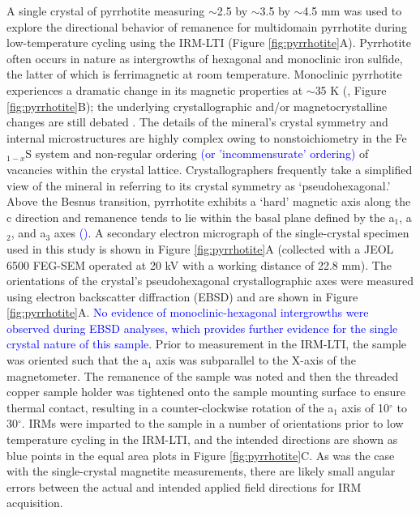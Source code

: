 \documentclass[draft,gc]{AGUTeX}
\begin{document}
\begin{article}
A single crystal of pyrrhotite measuring $\sim$2.5 by $\sim$3.5 by $\sim$4.5 mm was used to explore the directional behavior of remanence for multidomain pyrrhotite during low-temperature cycling using the IRM-LTI (Figure \ref{fig:pyrrhotite}A). Pyrrhotite often occurs in nature as intergrowths of hexagonal and monoclinic iron sulfide, the latter of which is ferrimagnetic at room temperature. Monoclinic pyrrhotite experiences a dramatic change in its magnetic properties at $\sim$35 K (\cite{Besnus1964a}, Figure \ref{fig:pyrrhotite}B); the underlying crystallographic and/or magnetocrystalline changes are still debated \citep{Wolfers2011a, Kind2013a}. The details of the mineral's crystal symmetry and internal microstructures are highly complex owing to nonstoichiometry in the Fe$_{1-x}$S system and non-regular ordering \textcolor{blue}{(or 'incommensurate' ordering)} of vacancies within the crystal lattice.  Crystallographers frequently take a simplified view of the mineral in referring to its crystal symmetry as `pseudohexagonal.' Above the Besnus transition, pyrrhotite exhibits a `hard' magnetic axis along the c direction and remanence tends to lie within the basal plane defined by the a$_{1}$, a$_{2}$, and a$_{3}$ axes \textcolor{blue}{(\cite{Martin-Hernandez2008a})}. A secondary electron micrograph of the single-crystal specimen used in this study is shown in Figure \ref{fig:pyrrhotite}A (collected with a JEOL 6500 FEG-SEM operated at 20 kV with a working distance of 22.8 mm). The orientations of the crystal's pseudohexagonal crystallographic axes were measured using electron backscatter diffraction (EBSD) and are shown in Figure \ref{fig:pyrrhotite}A. \textcolor{blue}{No evidence of monoclinic-hexagonal intergrowths were observed during EBSD analyses, which provides further evidence for the single crystal nature of this sample.} Prior to measurement in the IRM-LTI, the sample was oriented such that the a$_{1}$ axis was subparallel to the X-axis of the magnetometer.  The remanence of the sample was noted and then the threaded copper sample holder was tightened onto the sample mounting surface to ensure thermal contact, resulting in a counter-clockwise rotation of the a$_{1}$ axis of 10$^{\circ}$ to 30$^{\circ}$. IRMs were imparted to the sample in a number of orientations prior to low temperature cycling in the IRM-LTI, and the intended directions are shown as blue points in the equal area plots in Figure \ref{fig:pyrrhotite}C. As was the case with the single-crystal magnetite measurements, there are likely small angular errors between the actual and intended applied field directions for IRM acquisition.  


\end{article}
\end{document}
